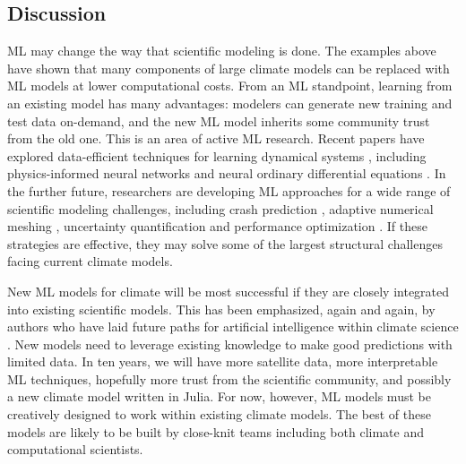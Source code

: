 \documentclass[11pt]{report}
\begin{document}
\subsection{Discussion}
\label{sec: climate models - ml+science}
 ML may change the way that scientific modeling is done. The examples above have shown that many components of large climate models can be replaced with ML models at lower computational costs. 
 From an ML standpoint, learning from an existing model has many advantages: modelers can generate new training and test data on-demand, and the new ML model inherits some community trust from the old one. This is an area of active ML research.
 Recent papers have explored data-efficient techniques for learning dynamical systems \cite{Raissi2018}, including physics-informed neural networks \cite{Raissi2017} and neural ordinary differential equations \cite{chen2018neural}. In the further future, researchers are developing ML approaches for a wide range of scientific modeling challenges, including crash prediction \cite{Lucas2013}, adaptive numerical meshing \cite{Jiang2016}, uncertainty quantification \cite{Ling2015, Lakshminarayanan2017} and performance optimization \cite{Thiagarajan2018}. If these strategies are effective, they may solve some of the largest structural challenges facing current climate models.
 
New ML models for climate will be most successful if they are closely integrated into existing scientific models. This has been emphasized, again and again, by authors who have laid future paths for artificial intelligence within climate science \cite{Lary2018,Gil2019,Rasp2018,McGovern2017using,Reichstein2019,Schneider2017}. New models need to leverage existing knowledge to make good predictions with limited data. In ten years, we will have more satellite data, more interpretable ML techniques, hopefully more trust from the scientific community, and possibly a new climate model written in Julia. For now, however, ML models must be creatively designed to work within existing climate models. The best of these models are likely to be built by close-knit teams including both climate and computational scientists.
\end{document}
